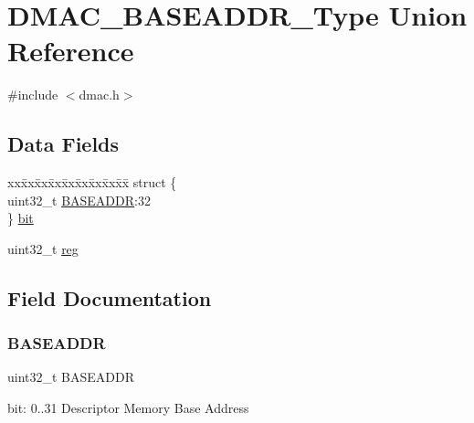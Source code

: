 \hypertarget{union_d_m_a_c___b_a_s_e_a_d_d_r___type}{}\section{D\+M\+A\+C\+\_\+\+B\+A\+S\+E\+A\+D\+D\+R\+\_\+\+Type Union Reference}
\label{union_d_m_a_c___b_a_s_e_a_d_d_r___type}


{\ttfamily \#include $<$dmac.\+h$>$}

\subsection*{Data Fields}
\begin{DoxyCompactItemize}
\item 
\begin{tabbing}
xx\=xx\=xx\=xx\=xx\=xx\=xx\=xx\=xx\=\kill
struct \{\\
\>uint32\_t \mbox{\hyperlink{union_d_m_a_c___b_a_s_e_a_d_d_r___type_a7d88a4c122ad48634b2a1214cae92820}{BASEADDR}}:32\\
\} \mbox{\hyperlink{union_d_m_a_c___b_a_s_e_a_d_d_r___type_abe37b598c26616126aeb777891ea2649}{bit}}\\

\end{tabbing}\item 
uint32\+\_\+t \mbox{\hyperlink{union_d_m_a_c___b_a_s_e_a_d_d_r___type_a6b91636401516a477989a336376d7b40}{reg}}
\end{DoxyCompactItemize}


\subsection{Field Documentation}
\mbox{\label{union_d_m_a_c___b_a_s_e_a_d_d_r___type_a7d88a4c122ad48634b2a1214cae92820}} 
\subsubsection{\texorpdfstring{BASEADDR}{BASEADDR}}
{\footnotesize\ttfamily uint32\+\_\+t B\+A\+S\+E\+A\+D\+DR}

bit\+: 0..31 Descriptor Memory Base Address \mbox{\label{union_d_m_a_c___b_a_s_e_a_d_d_r___type_abe37b598c26616126aeb777891ea2649}} 
